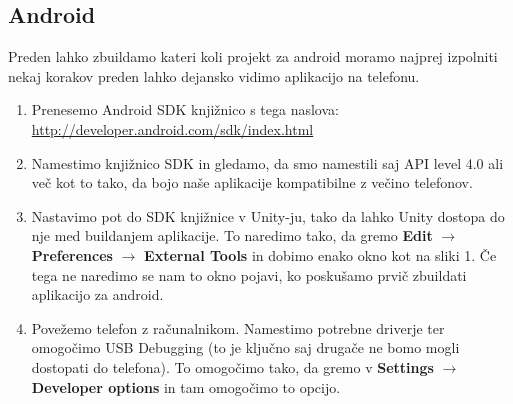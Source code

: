 {\color{indiagreen}\subsection{Android}}
Preden lahko zbuildamo kateri koli projekt za android moramo najprej izpolniti nekaj korakov preden lahko dejansko vidimo aplikacijo na telefonu.\cite{AndroidUnity}
\begin{enumerate}
	\item Prenesemo Android SDK knjižnico s tega naslova: \url{http://developer.android.com/sdk/index.html}
	\item Namestimo knjižnico SDK in gledamo, da smo namestili saj API level 4.0  ali več kot to tako, da bojo naše aplikacije kompatibilne z večino telefonov.
	\item Nastavimo pot do SDK knjižnice v Unity-ju, tako da lahko Unity dostopa do nje med buildanjem aplikacije. To naredimo tako, da gremo \textbf{Edit}  $\rightarrow$ \textbf{Preferences} $\rightarrow$ \textbf{External Tools} in dobimo enako okno kot na sliki 1. Če tega ne naredimo se nam to okno pojavi, ko poskušamo prvič zbuildati aplikacijo za android.
	\item Povežemo telefon z računalnikom. Namestimo potrebne driverje ter omogočimo USB Debugging (to je ključno saj drugače ne bomo mogli dostopati do telefona). To omogočimo tako, da gremo v \textbf{Settings}  $\rightarrow$ \textbf{Developer options} in tam omogočimo to opcijo.
\end{enumerate}